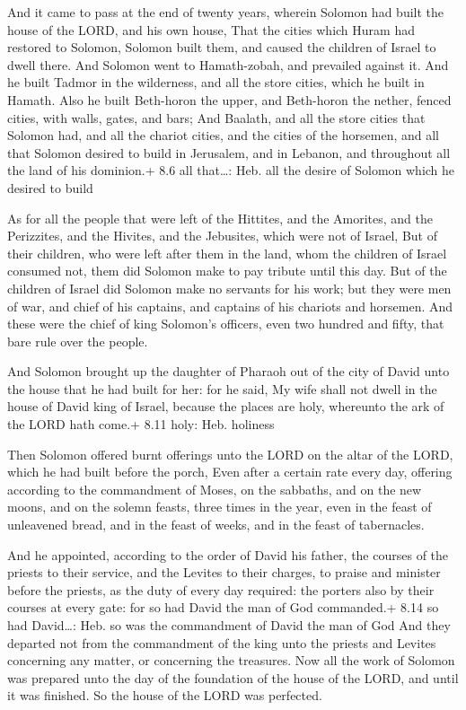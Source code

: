 And it came to pass at the end of twenty years, wherein
Solomon had built the house of the LORD, and his own house, 
That the cities which Huram had restored to Solomon, Solomon built them,
and caused the children of Israel to dwell there.  And
Solomon went to Hamath-zobah, and prevailed against it.  And
he built Tadmor in the wilderness, and all the store cities, which he
built in Hamath.  Also he built Beth-horon the upper, and
Beth-horon the nether, fenced cities, with walls, gates, and bars;
 And Baalath, and all the store cities that Solomon had, and
all the chariot cities, and the cities of the horsemen, and all that
Solomon desired to build in Jerusalem, and in Lebanon, and throughout
all the land of his dominion.+ 8.6 all that\ldots: Heb. all the desire
of Solomon which he desired to build

 As for all the people that were left of the Hittites, and
the Amorites, and the Perizzites, and the Hivites, and the Jebusites,
which were not of Israel,  But of their children, who were
left after them in the land, whom the children of Israel consumed not,
them did Solomon make to pay tribute until this day.  But of
the children of Israel did Solomon make no servants for his work; but
they were men of war, and chief of his captains, and captains of his
chariots and horsemen.  And these were the chief of king
Solomon's officers, even two hundred and fifty, that bare rule over the
people.

 And Solomon brought up the daughter of Pharaoh out of
the city of David unto the house that he had built for her: for he said,
My wife shall not dwell in the house of David king of Israel, because
the places are holy, whereunto the ark of the LORD hath come.+ 8.11
holy: Heb. holiness

 Then Solomon offered burnt offerings unto the LORD on
the altar of the LORD, which he had built before the porch,
 Even after a certain rate every day, offering according to
the commandment of Moses, on the sabbaths, and on the new moons, and on
the solemn feasts, three times in the year, even in the feast of
unleavened bread, and in the feast of weeks, and in the feast of
tabernacles.

 And he appointed, according to the order of David his
father, the courses of the priests to their service, and the Levites to
their charges, to praise and minister before the priests, as the duty of
every day required: the porters also by their courses at every gate: for
so had David the man of God commanded.+ 8.14 so had David\ldots: Heb. so
was the commandment of David the man of God  And they
departed not from the commandment of the king unto the priests and
Levites concerning any matter, or concerning the treasures.
 Now all the work of Solomon was prepared unto the day of
the foundation of the house of the LORD, and until it was finished. So
the house of the LORD was perfected.

